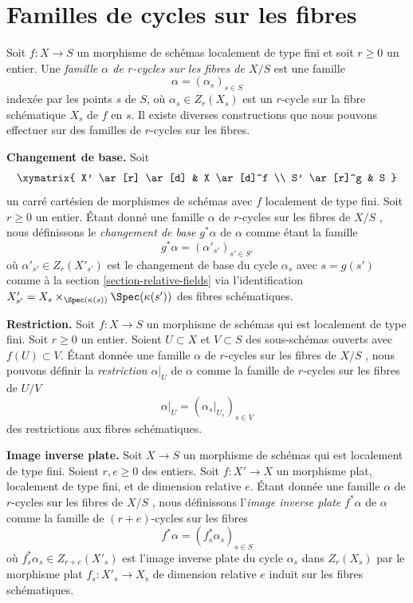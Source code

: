 \section{Familles de cycles sur les fibres} 
\label{section-cycles-fibres} 

\noindent
 Soit $f : X \to S$ un morphisme de schémas localement de type fini et 
soit $r \geq 0$ un entier. Une 
{\it famille $\alpha$ de $r$-cycles sur les fibres de $X/S$} est une famille 
$$
\alpha = (\alpha_s)_{s \in S}
$$
 indexée par les points $s$ de $S$, où $\alpha_s \in Z_r(X_s)$
 est un $r$-cycle sur la fibre schématique $X_s$ de $f$ en $s$.
 Il existe diverses constructions que nous pouvons effectuer sur des familles de  
$r$-cycles sur les fibres. 

\medskip\noindent
 {\bf  Changement de base. }  Soit 
$$
\xymatrix{
X' \ar[r] \ar[d] & X \ar[d]^f \\
S' \ar[r]^g & S
}
$$
 un carré cartésien de morphismes de schémas avec  $f$  localement de type fini. 
Soit  $r \geq 0$  un entier. Étant donné une famille  $\alpha$  de $r$-cycles sur les
 fibres de  $X/S$ , nous définissons le {\it  changement de base }   $g^*\alpha$  de $\alpha$
  comme étant la famille 
$$
g^*\alpha = (\alpha'_{s'})_{s' \in S'}
$$
 où  $\alpha'_{s'} \in Z_r(X'_{s'})$  est le changement de 
base du cycle  $\alpha_s$  avec  $s = g(s')$ comme à 
la section  \ref{section-relative-fields}  via l'identification  
$X'_{s'} = X_s \times_{\Spec(\kappa(s))} \Spec(\kappa(s'))$
  des fibres schématiques. 

\medskip\noindent
 {\bf  Restriction.}  Soit  $f : X \to S$  un morphisme de schémas qui est localement
 de type fini. Soit  $r \geq 0$  un entier. Soient $U \subset X$  et  
$V \subset S$  des sous-schémas ouverts avec  $f(U) \subset V$. Étant donnée une famille  
$\alpha$  de  $r$-cycles sur les fibres de $X/S$ , nous pouvons définir la 
 {\it restriction}   $\alpha|_U$  de  $\alpha$  comme la 
famille de $r$-cycles sur les fibres de  $U/V$
$$
\alpha|_U = (\alpha_s|_{U_s})_{s \in V}
$$
 des restrictions aux fibres schématiques. 

\medskip\noindent
 {\bf Image inverse plate.}  Soit  $X \to S$  un morphisme de schémas qui est localement 
de type fini. Soient  $r, e \geq 0$  des entiers. Soit $f : X' \to X$  un 
morphisme plat, localement de type fini, et de dimension relative $e$. 
Étant donnée une famille  $\alpha$  de  $r$-cycles 
sur les fibres de  $X/S$ , nous définissons l'{\it image inverse plate}   $f^*\alpha$  de  $\alpha$
  comme la famille de $(r + e)$-cycles sur les fibres 
$$
f^*\alpha = (f_s^*\alpha_s)_{s \in S}
$$
 où  $f_s^*\alpha_s \in Z_{r + e}(X'_s)$  est l'image inverse 
plate du cycle  $\alpha_s$  dans  $Z_r(X_s)$  par le morphisme plat  
$f_s : X'_s \to X_s$  de dimension relative $e$
 induit sur les fibres schématiques. 

